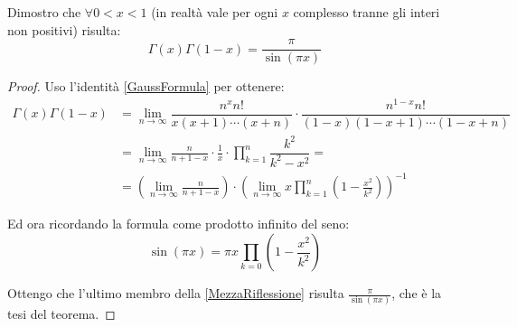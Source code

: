 \begin{theorem}
\label{Riflessione}
Dimostro che $\forall 0<x<1$ (in realtà vale per ogni $x$ complesso tranne gli interi non positivi) risulta:
\begin{equation}
	\Gamma(x)\Gamma(1-x)=\frac{\pi}{\sin(\pi x)}
\end{equation}

\end{theorem}

\begin{proof}
Uso l'identità \ref{GaussFormula} per ottenere:
\begin{equation}
\label{MezzaRiflessione}
\begin{split}
\Gamma(x)\Gamma(1-x) & = \lim_{n\to\infty} \dfrac{n^xn!}{x(x+1)\cdots (x+n)} \cdot \dfrac{n^{1-x}n!}{(1-x)(1-x+1)\cdots (1-x+n)}\\
 & =\lim_{n\to\infty} \frac{n}{n+1-x} \cdot \frac{1}{x} \cdot \prod_{k=1}^{n}\dfrac{k^2}{k^2-x^2} = \\
  & =\left(\lim_{n\to\infty} \frac{n}{n+1-x} \right) \cdot \left( \lim_{n\to\infty} x \prod_{k=1}^{n}\left(1-\frac{x^2}{k^2}\right) \right)^{-1}
\end{split}
\end{equation}

Ed ora ricordando la formula come prodotto infinito del seno:
\begin{equation}
	\sin(\pi x)=\pi x \prod_{k=0} \left(1-\frac{x^2}{k^2}\right)
\end{equation}

Ottengo che l'ultimo membro della \eqref{MezzaRiflessione} risulta $\frac{\pi}{\sin(\pi x)}$, che è la tesi del teorema.


\end{proof}
